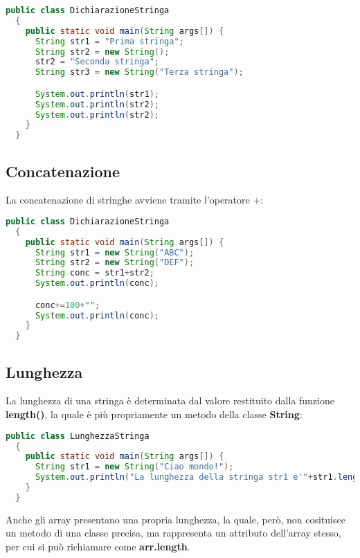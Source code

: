 \documentclass[a4paper]{extarticle}
\begin{document}
\vspace{1em}
\noindent
\begin{lstlisting}[language=Java, caption=Esempio dichiarazione stringa in Java]
  public class DichiarazioneStringa
  {
    public static void main(String args[]) {
      String str1 = "Prima stringa";
      String str2 = new String();
      str2 = "Seconda stringa";
      String str3 = new String("Terza stringa");

      System.out.println(str1);
      System.out.println(str2);
      System.out.println(str2);
    }
  }
\end{lstlisting}

\vspace{1em}
\subsection{Concatenazione}
La concatenazione di stringhe avviene tramite l'operatore $+$:

\vspace{1em}
\noindent
\begin{lstlisting}[language=Java, caption=Dichiarazione di una stringa in Java]
  public class DichiarazioneStringa
  {
    public static void main(String args[]) {
      String str1 = new String("ABC");
      String str2 = new String("DEF");
      String conc = str1+str2;
      System.out.println(conc);

      conc+=100+"";
      System.out.println(conc);
    }
  }
\end{lstlisting}

\vspace{1em}
\subsection{Lunghezza}
La lunghezza di una stringa è determinata dal valore restituito dalla funzione \textbf{length()}, la quale è più propriamente un metodo della classe \textbf{String}:

\vspace{1em}
\noindent
\begin{lstlisting}[language=Java, caption=Lunghezza di una stringa in Java]
  public class LunghezzaStringa
  {
    public static void main(String args[]) {
      String str1 = new String("Ciao mondo!");
      System.out.println("La lunghezza della stringa str1 e'"+str1.length);
    }
  }
\end{lstlisting}

\vspace{1em}
\noindent
Anche gli array presentano una propria lunghezza, la quale, però, non cosituisce un metodo di una classe precisa, ma rappresenta un attributo dell'array stesso, per cui si può richiamare come \textbf{arr.length}.
\end{document}
